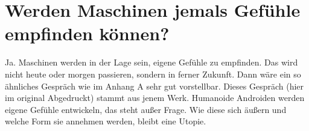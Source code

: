 \section{Werden Maschinen jemals Gefühle empfinden können?}
Ja. Maschinen werden in der Lage sein, eigene Gefühle zu empfinden. Das wird nicht heute oder morgen passieren, sondern in ferner Zukunft. Dann wäre ein so ähnliches Gespräch wie im Anhang A sehr gut vorstellbar. Dieses Gespräch (hier im original Abgedruckt) stammt aus jenem Werk. Humanoide Androiden werden eigene Gefühle entwickeln, das steht außer Frage. Wie diese sich äußern und welche Form sie annehmen werden, bleibt eine Utopie.

